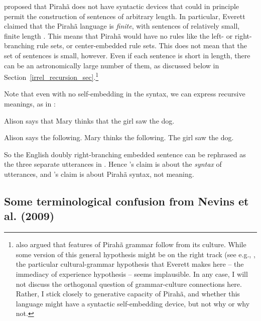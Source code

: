 \documentclass{article}
\begin{document}
\cite{everett2005cultural} proposed that Pirahã does not have syntactic devices that could in principle permit the construction of sentences of arbitrary length. In particular, Everett claimed that the Pirahã language is \textit{finite}, with sentences of relatively small, finite length \citep{everett2012does}. This means that Pirahã would have no rules like the left- or right-branching rule sets, or center-embedded rule sets.  This does not mean that the set of sentences is small, however.  Even if each sentence is short in length, there can be an astronomically large number of them, as discussed below in Section~\ref{irrel_recursion_sec}.\footnote{\cite{everett2005cultural} also argued that features of Pirahã grammar follow from its culture.  While some version of this general hypothesis might be on the right track (see e.g., \cite{gil2021tense}, the particular cultural-grammar hypothesis that Everett makes here -- the immediacy of experience hypothesis -- seems implausible.  In any case, I will not discuss the orthogonal question of grammar-culture connections here.  Rather, I stick closely to generative capacity of Pirahã, and whether this language might have a syntactic  self-embedding device, but not why or why not.}

Note that even with no self-embedding in the syntax, we can express recursive meanings, as in :

\begin{myexample}
\label{rec_meaning}
\begin{examples}
\item \label{rec_meaning1} Alison says that Mary thinks that the girl saw the dog.
\item \label{rec_meaning2} Alison says the following. Mary thinks the following. The girl saw the dog.
\end{examples}
\end{myexample}

So the English doubly right-branching embedded sentence  can be rephrased as the three separate utterances in . 
 Hence \cite{hauser2002faculty}’s claim is about the \textit{syntax} of utterances, and \cite{everett2005cultural}’s claim is about Pirahã syntax, not meaning.

\subsection{Some terminological confusion from Nevins et al. (2009)}
\end{document}
